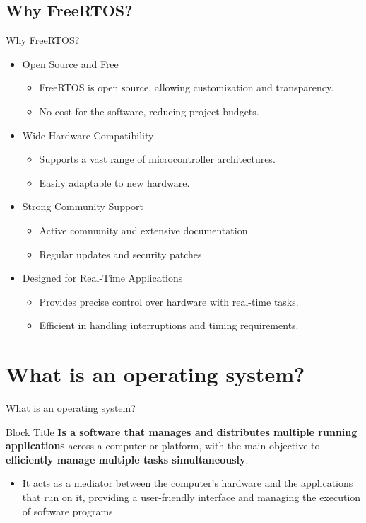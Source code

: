 \documentclass[10pt]{beamer}
\begin{document}
\subsection{Why FreeRTOS?}
\begin{frame}{Why FreeRTOS?}
  \begin{itemize}
    \item Open Source and Free
        \begin{itemize}
            \item FreeRTOS is open source, allowing customization and transparency.
            \item No cost for the software, reducing project budgets.
        \end{itemize}
    \item Wide Hardware Compatibility
        \begin{itemize}
            \item Supports a vast range of microcontroller architectures.
            \item Easily adaptable to new hardware.
        \end{itemize}
    \item Strong Community Support
        \begin{itemize}
            \item Active community and extensive documentation.
            \item Regular updates and security patches.
        \end{itemize}
    \item Designed for Real-Time Applications
        \begin{itemize}
            \item Provides precise control over hardware with real-time tasks.
            \item Efficient in handling interruptions and timing requirements.
        \end{itemize}
  \end{itemize}
\end{frame}

\section{What is an operating system?}
    \begin{frame}{What is an operating system?}

      \begin{block}{Block Title}
        \textbf{Is a software that manages and distributes multiple running applications} across a computer or platform, with the main objective to \textbf{efficiently manage multiple tasks simultaneously}.
      \end{block}
      \begin{itemize}
        \item It acts as a mediator between the computer's hardware and the applications that run on it, providing a user-friendly interface and managing the execution of software programs.
      \end{itemize}
    \end{frame}
\end{document}
